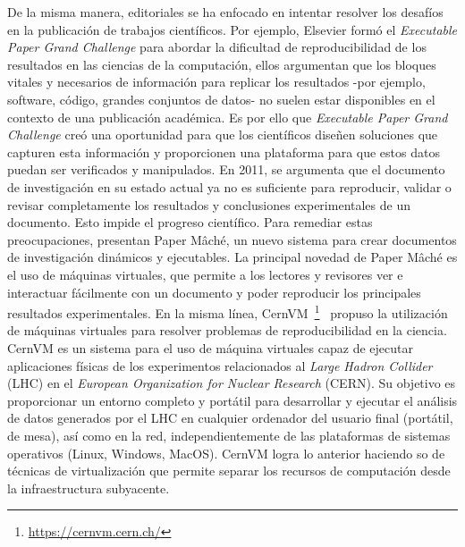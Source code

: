 De la misma manera, editoriales se ha enfocado en intentar resolver los desafíos en la publicación de trabajos científicos. Por ejemplo, Elsevier formó el \textit{Executable Paper Grand Challenge} para abordar la dificultad de reproducibilidad de los resultados en las ciencias de la computación, ellos  argumentan que los bloques vitales y necesarios de información para replicar los resultados -por ejemplo, software, código, grandes conjuntos de datos- no suelen estar disponibles en el contexto de una publicación académica. 
Es por ello que \textit{Executable Paper Grand Challenge} creó una oportunidad para que los científicos diseñen soluciones que capturen esta información y proporcionen una plataforma para que estos datos puedan ser verificados y manipulados. 
En 2011, \cite{DBLP:journals/procedia/BrammerCMW11} se argumenta que el documento de investigación en su estado actual ya no es suficiente para reproducir, validar o revisar completamente los resultados y conclusiones experimentales de un documento. Esto impide el progreso científico. 
Para remediar estas preocupaciones, presentan Paper Mâché, un nuevo sistema para crear documentos de investigación dinámicos y ejecutables. La principal novedad de Paper Mâché es el uso de máquinas virtuales, que permite a los lectores y revisores ver e interactuar fácilmente con un documento y poder reproducir los principales resultados experimentales.
En la misma línea, CernVM~\footnote{\url{https://cernvm.cern.ch/}}~\cite{buncic2010cernvm} propuso la utilización de máquinas virtuales para resolver problemas de reproducibilidad en la ciencia. CernVM es un sistema para el uso de máquina virtuales capaz de ejecutar aplicaciones físicas de los experimentos relacionados al \textit{Large Hadron Collider} (LHC) en el \textit{European Organization for Nuclear Research} (CERN). Su objetivo es proporcionar un entorno completo y portátil para desarrollar y ejecutar el análisis de datos generados por el LHC en cualquier ordenador del usuario final (portátil, de mesa), así como en la red, independientemente de las plataformas de sistemas operativos (Linux, Windows, MacOS). 
CernVM logra lo anterior haciendo so de técnicas de virtualización que permite separar los recursos de computación desde la infraestructura subyacente.

